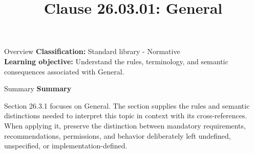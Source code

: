 \documentclass[10pt,letterpaper]{article}
\title{Clause 26.03.01: General}
\author{}
\date{}
\begin{document}
\maketitle
\begin{CornellOverviewBox}{Overview}
\textbf{Classification:} Standard library - Normative\\[2pt]
\textbf{Learning objective:} Understand the rules, terminology, and semantic consequences associated with General.
\end{CornellOverviewBox}\begin{CornellSummaryBox}{Summary}
{\sffamily\bfseries\color{Accent} Summary}\par\vspace{3pt}Section 26.3.1 focuses on General. The section supplies the rules and semantic distinctions needed to interpret this topic in context with its cross-references. When applying it, preserve the distinction between mandatory requirements, recommendations, permissions, and behavior deliberately left undefined, unspecified, or implementation-defined.
\end{CornellSummaryBox}
\end{document}
